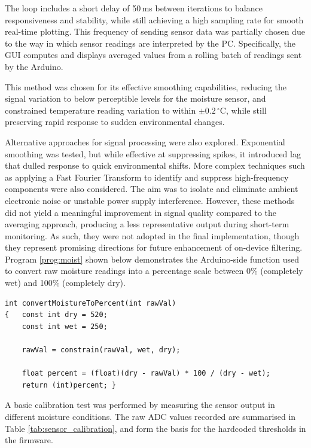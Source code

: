 \documentclass[a4paper,11pt]{article}
\begin{document}
The loop includes a short delay of 50\,ms between iterations to balance 
responsiveness and stability, while still achieving a high sampling rate 
for smooth real-time plotting.
This frequency of sending sensor data was partially chosen due to 
the way in which sensor readings are interpreted by the PC.
Specifically, the GUI computes and displays averaged values from a rolling 
batch of readings sent by the Arduino.

This method was chosen for its effective smoothing capabilities,
reducing the signal variation to below 
perceptible levels for the moisture sensor, 
and constrained temperature reading variation to within 
$\pm 0.2\,^\circ\mathrm{C}$, while still preserving rapid 
response to sudden environmental changes.

Alternative approaches for signal processing were also explored.
Exponential smoothing was tested, but while effective at 
suppressing spikes, it introduced lag that dulled response to 
quick environmental shifts. 
More complex techniques such as applying a Fast Fourier Transform 
to identify and suppress high-frequency components were also considered. 
The aim was to isolate and eliminate ambient electronic noise 
or unstable power supply interference.
However, these methods did not yield a meaningful 
improvement in signal quality compared to the averaging approach,
producing a less representative output during short-term monitoring. 
As such, they were not adopted in the final implementation, 
though they represent promising directions for future enhancement 
of on-device filtering. 
Program \ref{prog:moist} shown below demonstrates 
the Arduino-side function used to convert raw moisture readings 
into a percentage scale between 0\% (completely wet) and 100\% (completely dry).

\begin{lstlisting}[style=cpp-style, 
caption={Arduino moisture conversion}, label={prog:moist}]
int convertMoistureToPercent(int rawVal)
{   const int dry = 520;
    const int wet = 250;

    rawVal = constrain(rawVal, wet, dry);

    float percent = (float)(dry - rawVal) * 100 / (dry - wet);
    return (int)percent; }
\end{lstlisting}

A basic calibration test was performed by measuring the sensor output 
in different moisture conditions. 
The raw ADC values recorded are summarised in 
Table \ref{tab:sensor_calibration}, 
and form the basis for the hardcoded thresholds in the firmware.
\end{document}

